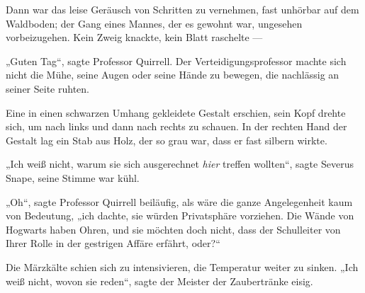 Dann war das leise Geräusch von Schritten zu vernehmen, fast unhörbar auf dem Waldboden; der Gang eines Mannes, der es gewohnt war, ungesehen vorbeizugehen. Kein Zweig knackte, kein Blatt raschelte —

„Guten Tag“, sagte Professor Quirrell. Der Verteidigungsprofessor machte sich nicht die Mühe, seine Augen oder seine Hände zu bewegen, die nachlässig an seiner Seite ruhten.

Eine in einen schwarzen Umhang gekleidete Gestalt erschien, sein Kopf drehte sich, um nach links und dann nach rechts zu schauen. In der rechten Hand der Gestalt lag ein Stab aus Holz, der so grau war, dass er fast silbern wirkte.

„Ich weiß nicht, warum sie sich ausgerechnet \emph{hier} treffen wollten“, sagte Severus Snape, seine Stimme war kühl.

„Oh“, sagte Professor Quirrell beiläufig, als wäre die ganze Angelegenheit kaum von Bedeutung, „ich dachte, sie würden Privatsphäre vorziehen. Die Wände von Hogwarts haben Ohren, und sie möchten doch nicht, dass der Schulleiter von Ihrer Rolle in der gestrigen Affäre erfährt, oder?“

Die Märzkälte schien sich zu intensivieren, die Temperatur weiter zu sinken.
„Ich weiß nicht, wovon sie reden“, sagte der Meister der Zaubertränke eisig.

